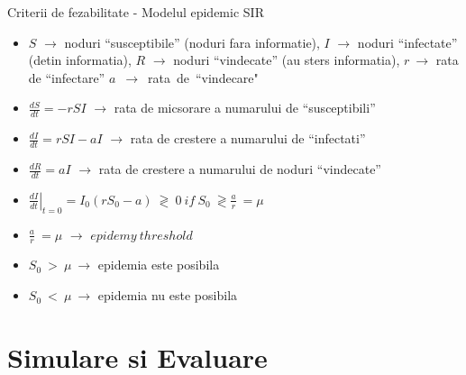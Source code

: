 \documentclass{beamer}
\begin{document}
\begin{frame}{Criterii de fezabilitate - Modelul epidemic SIR}
	\begin{itemize}
	  \item $S$ $\rightarrow$ noduri ``susceptibile'' (noduri fara informatie), $I$
	  $\rightarrow$ noduri ``infectate'' (detin informatia), $R$ $\rightarrow$ noduri
	  ``vindecate'' (au sters informatia), $r\ \rightarrow$ rata de ``infectare''
	  \mbox{$a$ $\rightarrow$ rata de ``vindecare"}
	  \item $\frac{dS}{dt} = -rSI$ $\rightarrow$ rata de micsorare a numarului de
	  ``susceptibili''
	  \item $\frac{dI}{dt} = rSI - aI$ $\rightarrow$ rata de crestere a numarului
	  de ``infectati''
	  \item $\frac{dR}{dt} = aI$ $\rightarrow$ rata de crestere a numarului de
	  noduri ``vindecate''
	  \item $\left.
\frac{dI}{dt}
\right|_{t=0} = I_{0} (rS_{0} - a)\ \gtrless\ 0\ if\ S_{0}\ \gtrless
\frac{a}{r}\ = \mu$
	\end{itemize}
	\hskip0.5in
	\small{
		\begin{beamerboxesrounded}[lower=block body,shadow=true,width=3.2in]{}
			\begin{itemize}
				\item{$\frac{a}{r}\ = \mu$ $\rightarrow$ $epidemy\ threshold$}
				\item{$S_{0}\ >\ \mu\ \rightarrow$ epidemia este posibila}
				\item{$S_{0}\ <\ \mu\ \rightarrow$ epidemia nu este posibila}
			\end{itemize}
		\end{beamerboxesrounded}
	}
\end{frame}

\section{Simulare si Evaluare}
\end{document}

